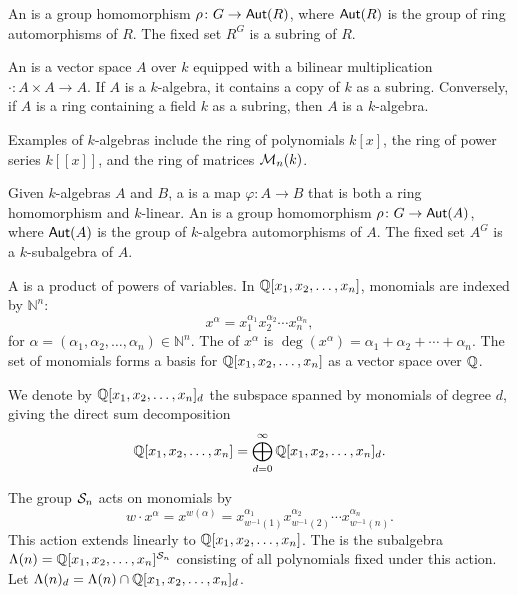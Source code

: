 An  is a group homomorphism \(\rho \colon G \to \operatorname{\mathsf{Aut}}(R)\), where \(\operatorname{\mathsf{Aut}}(R)\) is the group of ring automorphisms of \(R\). The fixed set \(R^G\) is a subring of \(R\).

An  is a vector space \(A\) over \(k\) equipped with a bilinear multiplication \(\cdot \colon A \times A \to A\). If \(A\) is a \(k\)-algebra, it contains a copy of \(k\) as a subring. Conversely, if \(A\) is a ring containing a field \(k\) as a subring, then \(A\) is a \(k\)-algebra.

Examples of \(k\)-algebras include the ring of polynomials \(k[x]\), the ring of power series \(k[[x]]\), and the ring of matrices \(\operatorname{\mathcal{M}}_n(k)\).

Given \(k\)-algebras \(A\) and \(B\), a  is a map \(\varphi \colon A \to B\) that is both a ring homomorphism and \(k\)-linear. An  is a group homomorphism \(\rho \colon G \to \operatorname{\mathsf{Aut}}(A)\), where \(\operatorname{\mathsf{Aut}}(A)\) is the group of \(k\)-algebra automorphisms of \(A\). The fixed set \(A^G\) is a \(k\)-subalgebra of \(A\).

A  is a product of powers of variables. In \(\mathbb{Q}[x_1, x_2, \ldots, x_n]\), monomials are indexed by \(\mathbb{N}^n\):
\[
    x^\alpha = x_1^{\alpha_1}x_2^{\alpha_2}\cdots x_n^{\alpha_n},
\]
for \(\alpha = (\alpha_1, \alpha_2, \ldots, \alpha_n) \in \mathbb{N}^n\). The  of \(x^\alpha\) is \(\deg(x^\alpha) = \alpha_1 + \alpha_2 + \cdots + \alpha_n\). The set of monomials forms a basis for \(\mathbb{Q}[x_1, x_2, \ldots, x_n]\) as a vector space over \(\mathbb{Q}\).

We denote by \(\mathbb{Q}[x_1, x_2, \ldots, x_n]_d\) the subspace spanned by monomials of degree \(d\), giving the direct sum decomposition
\[
    \mathbb{Q}[x_1, x_2, \ldots, x_n] = \bigoplus_{d=0}^\infty \mathbb{Q}[x_1, x_2, \ldots, x_n]_d.
\]

The group \(\mathcal{S}_{n}\) acts on monomials by
\[
    w \cdot x^\alpha = x^{w(\alpha)} = x_{w^{-1}(1)}^{\alpha_1}x_{w^{-1}(2)}^{\alpha_2}\cdots x_{w^{-1}(n)}^{\alpha_n}.
\]
This action extends linearly to \(\mathbb{Q}[x_1, x_2, \ldots, x_n]\).
The  is the subalgebra \(\operatorname{\Lambda}(n) = \mathbb{Q}[x_1, x_2, \ldots, x_n]^{\mathcal{S}_{n}}\) consisting of all polynomials fixed under this action.
Let \(\operatorname{\Lambda}(n)_d = \operatorname{\Lambda}(n) \cap \mathbb{Q}[x_1, x_2, \ldots, x_n]_d\).

